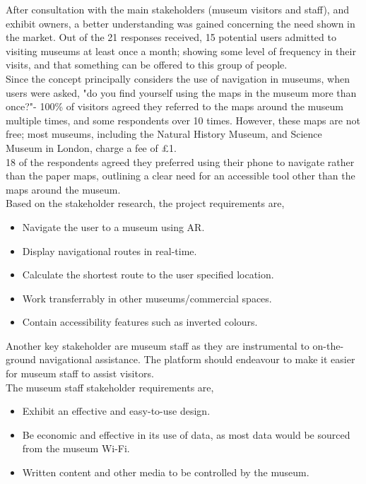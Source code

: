 
After consultation with the main stakeholders (museum visitors and staff), and exhibit owners, a better understanding was gained concerning the need shown in the market. Out of the 21 responses received, 15 potential users admitted to visiting museums at least once a month; showing some level of frequency in their visits, and that something can be offered to this group of people.\\

Since the concept principally considers the use of navigation in museums, when users were asked, "do you find yourself using the maps in the museum more than once?"- 100\% of visitors agreed they referred to the maps around the museum multiple times, and some respondents over 10 times. However, these maps are not free; most museums, including the Natural History Museum, and Science Museum in London, charge a fee of £1.\\

18 of the respondents agreed they preferred using their phone to navigate rather than the paper maps, outlining a clear need for an accessible tool other than the maps around the museum.\\

Based on the stakeholder research, the project requirements are, 
\begin{itemize}
    \item Navigate the user to a museum using AR.
    \item Display navigational routes in real-time.
    \item Calculate the shortest route to the user specified location.
    \item Work transferrably in other museums/commercial spaces.
    \item Contain accessibility features such as inverted colours.
\end{itemize}

Another key stakeholder are museum staff as they are instrumental to on-the-ground navigational assistance. The platform should endeavour to make it easier for museum staff to assist visitors.\\

The museum staff stakeholder requirements are,
\begin{itemize}
    \item Exhibit an effective and easy-to-use design. 
    \item Be economic and effective in its use of data, as most data would be sourced from the museum Wi-Fi. 
    \item Written content and other media to be controlled by the museum.
\end{itemize}

